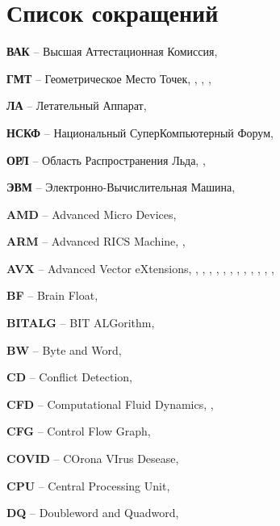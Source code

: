 \newpage

\section*{Список сокращений}

\textbf{ВАК} -- Высшая Аттестационная Комиссия, \pageref{abbr:vak-1}

\textbf{ГМТ} -- Геометрическое Место Точек, \pageref{abbr:gmt-1}, \pageref{abbr:gmt-2}, \pageref{abbr:gmt-3}, \pageref{abbr:gmt-4}

\textbf{ЛА} -- Летательный Аппарат, \pageref{abbr:la-1}

\textbf{НСКФ} -- Национальный СуперКомпьютерный Форум, \pageref{abbr:nscf-1}

\textbf{ОРЛ} -- Область Распространения Льда, \pageref{abbr:orl-1}, \pageref{abbr:orl-2}

\textbf{ЭВМ} -- Электронно-Вычислительная Машина, \pageref{abbr:evm-1}

\textbf{AMD} -- Advanced Micro Devices, \pageref{abbr:amd-1}

\textbf{ARM} -- Advanced RICS\label{abbr:risc-1} Machine, \pageref{abbr:arm-1}, \pageref{abbr:arm-2}

\textbf{AVX} -- Advanced Vector eXtensions, \pageref{abbr:avx-1}, \pageref{abbr:avx-2}, \pageref{abbr:avx-3}, \pageref{abbr:avx-4}, \pageref{abbr:avx-5}, \pageref{abbr:avx-6}, \pageref{abbr:avx-7}, \pageref{abbr:avx-8}, \pageref{abbr:avx-9}, \pageref{abbr:avx-10}, \pageref{abbr:avx-11}, \pageref{abbr:avx-12}, \pageref{abbr:avx-13}

\textbf{BF} -- Brain Float, \pageref{abbr:bf-1}

\textbf{BITALG} -- BIT ALGorithm, \pageref{abbr:bitalg-1}

\textbf{BW} -- Byte and Word, \pageref{abbr:bw-1}

\textbf{CD} -- Conflict Detection, \pageref{abbr:cd-1}

\textbf{CFD} -- Computational Fluid Dynamics, \pageref{abbr:cfd-1}, \pageref{abbr:cfd-2}

\textbf{CFG} -- Control Flow Graph, \pageref{abbr:cfg-1}

\textbf{COVID} -- COrona VIrus Desease, \pageref{abbr:covid-1}

\textbf{CPU} -- Central Processing Unit, \pageref{abbr:cpu-1}

\textbf{DQ} -- Doubleword and Quadword, \pageref{abbr:dq-1}

